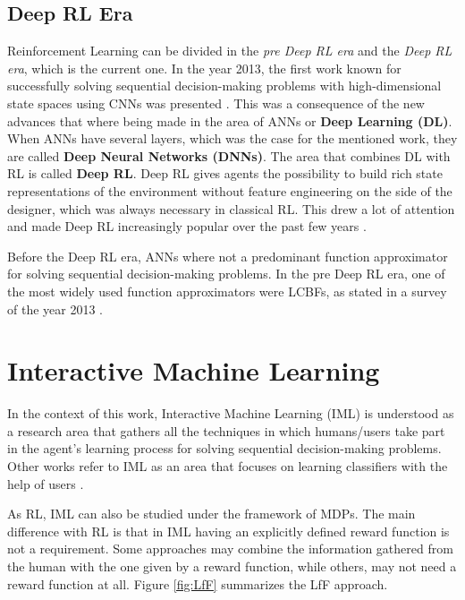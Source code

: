 \subsection{Deep RL Era}

Reinforcement Learning can be divided in the \emph{pre Deep RL era} and the \emph{Deep RL era}, which is the current one. In the year 2013, the first work known for successfully solving sequential decision-making problems with high-dimensional state spaces using CNNs was presented \cite{atari}. This was a consequence of the new advances that where being made in the area of ANNs or \textbf{Deep Learning (DL)}. When ANNs have several layers, which was the case for the mentioned work, they are called \textbf{Deep Neural Networks (DNNs)}. The area that combines DL with RL is called \textbf{Deep RL}. Deep RL gives agents the possibility to build rich state representations of the environment without feature engineering on the side of the designer, which was always necessary in classical RL. This drew a lot of attention and made Deep RL increasingly popular over the past few years \cite{franccois2018introduction}.

Before the Deep RL era, ANNs where not a predominant function approximator for solving sequential decision-making problems. In the pre Deep RL era, one of the most widely used function approximators were LCBFs, as stated in a survey of the year 2013 \cite{kober2013reinforcement}. 

\section[Interactive Machine Learning]{Interactive Machine Learning \cite{Argall2009, amershi2014power,billing2010formalism, Chernova2014, cuayahuitl2013machine}}

In the context of this work, Interactive Machine Learning (IML) is understood as a research area that gathers all the techniques in which humans/users take part in the agent's learning process for solving sequential decision-making problems. Other works refer to IML as an area that focuses on learning classifiers with the help of users \cite{fails2003interactive, ware2001interactive, amershi2012regroup, ngo2014efficient}.

As RL, IML can also be studied under the framework of MDPs. The main difference with RL is that in IML having an explicitly defined reward function is not a requirement. Some approaches may combine the information gathered from the human with the one given by a reward function, while others, may not need a reward function at all. Figure \ref{fig:LfF} summarizes the LfF approach.

